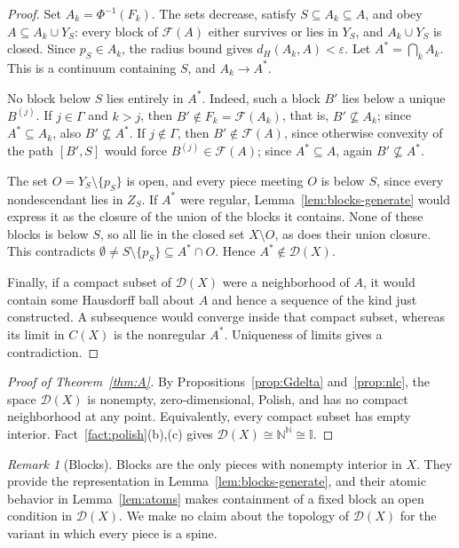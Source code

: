 \documentclass[11pt]{amsart}
\theoremstyle{definition}
\theoremstyle{remark}
\newtheorem{remark}[theorem]{Remark}
\newcommand{\D}{\mathcal{D}}
\newcommand{\Fc}{\mathcal{F}}
\newcommand{\N}{\mathbb{N}}
\newcommand{\I}{\mathbb{I}}
\newcommand{\dH}{d_H}
\begin{document}
\begin{proof}
Set $A_k=\Phi^{-1}(F_k)$. The sets decrease, satisfy $S\subseteq A_k\subseteq A$, and obey $A\subseteq A_k\cup Y_S$: every block of $\Fc(A)$ either survives or lies in $Y_S$, and $A_k\cup Y_S$ is closed. Since $p_S\in A_k$, the radius bound gives $\dH(A_k,A)<\varepsilon$. Let $A^*=\bigcap_kA_k$. This is a continuum containing $S$, and $A_k\to A^*$.

No block below $S$ lies entirely in $A^*$. Indeed, such a block $B'$ lies below a unique $B^{(j)}$. If $j\in\Gamma$ and $k>j$, then $B'\notin F_k=\Fc(A_k)$, that is, $B'\not\subseteq A_k$; since $A^*\subseteq A_k$, also $B'\not\subseteq A^*$. If $j\notin\Gamma$, then $B'\notin\Fc(A)$, since otherwise convexity of the path $[B',S]$ would force $B^{(j)}\in\Fc(A)$; since $A^*\subseteq A$, again $B'\not\subseteq A^*$.

The set $O=Y_S\setminus\{p_S\}$ is open, and every piece meeting $O$ is below $S$, since every nondescendant lies in $Z_S$. If $A^*$ were regular, Lemma~\ref{lem:blocks-generate} would express it as the closure of the union of the blocks it contains. None of these blocks is below $S$, so all lie in the closed set $X\setminus O$, as does their union closure. This contradicts $\emptyset\neq S\setminus\{p_S\}\subseteq A^*\cap O$. Hence $A^*\notin\D(X)$.

Finally, if a compact subset of $\D(X)$ were a neighborhood of $A$, it would contain some Hausdorff ball about $A$ and hence a sequence of the kind just constructed. A subsequence would converge inside that compact subset, whereas its limit in $C(X)$ is the nonregular $A^*$. Uniqueness of limits gives a contradiction.
\end{proof}

\begin{proof}[Proof of Theorem~\ref{thm:A}]
By Propositions~\ref{prop:Gdelta} and~\ref{prop:nlc}, the space $\D(X)$ is nonempty, zero-dimensional, Polish, and has no compact neighborhood at any point. Equivalently, every compact subset has empty interior. Fact~\ref{fact:polish}(b),(c) gives $\D(X)\cong\N^\N\cong\I$.
\end{proof}

\begin{remark}[Blocks]\label{rem:blocks}
Blocks are the only pieces with nonempty interior in $X$. They provide the representation in Lemma~\ref{lem:blocks-generate}, and their atomic behavior in Lemma~\ref{lem:atoms} makes containment of a fixed block an open condition in $\D(X)$. We make no claim about the topology of $\D(X)$ for the variant in which every piece is a spine.
\end{remark}
\end{document}

